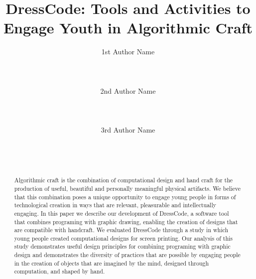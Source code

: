 \documentclass{sigchi}
\begin{document}
\title{DressCode: Tools and Activities to Engage Youth in Algorithmic Craft}

\author{
 \alignauthor 1st Author Name\\
  \\
  \\
  \\
 \alignauthor 2nd Author Name\\
  \\
  \\
  \\
 \alignauthor 3rd Author Name\\
  \\
  \\
  \\
}

\maketitle

\begin{abstract}
	Algorithmic craft is the combination of computational design and hand craft for the production of useful, beautiful and personally meaningful physical artifacts. We believe that this combination poses a unique opportunity to engage young people in forms of technological creation in ways that are relevant, pleasurable and intellectually engaging. In this paper we describe our development of DressCode, a software tool that combines programing with graphic drawing, enabling the creation of designs that are compatible with handcraft. We evaluated DressCode through a study in which young people created computational designs for screen printing. Our analysis of this study demonstrates useful design principles for combining programing with graphic design and demonstrates the diversity of practices that are possible by engaging people in the creation of objects that are imagined by the mind, designed through computation, and shaped by hand.
\end{abstract}


\end{document}
